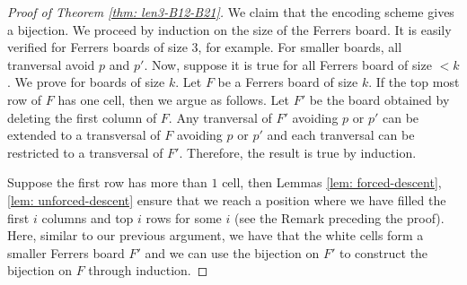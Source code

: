 \documentclass[12pt, english, a4paper]{article}
\theoremstyle{plain}
\theoremstyle{definition}
\theoremstyle{remark}
\begin{document}
\begin{proof}[Proof of Theorem \ref{thm: len3-B12-B21}]
    We claim that the encoding scheme gives a bijection. We proceed by induction on the size of the Ferrers board. It is easily verified for Ferrers boards of size $3$, for example. For smaller boards, all tranversal avoid $p$ and $p'$. Now, suppose it is true for all Ferrers board of size $<k$. We prove for boards of size $k$. Let $F$ be a Ferrers board of size $k$. If the top most row of $F$ has one cell, then we argue as follows. Let $F'$ be the board obtained by deleting the first column of $F$. Any tranversal of $F'$ avoiding $p$ or $p'$ can be extended to a transversal of $F$ avoiding $p$ or $p'$ and each tranversal can be restricted to a transversal of $F'$. Therefore, the result is true by induction.

    Suppose the first row has more than $1$ cell, then Lemmas \ref{lem: forced-descent}, \ref{lem: unforced-descent} ensure that we reach a position where we have filled the first $i$ columns and top $i$ rows for some $i$ (see the Remark preceding the proof). Here, similar to our previous argument, we have that the white cells form a smaller Ferrers board $F'$ and we can use the bijection on $F'$ to construct the bijection on $F$ through induction.
\end{proof}
\end{document}
